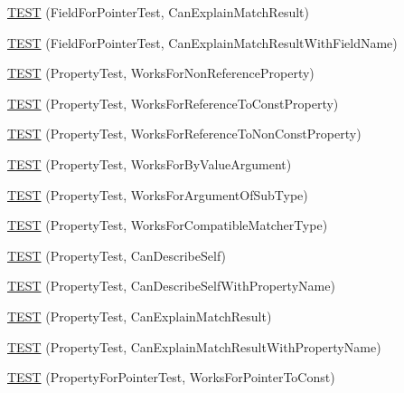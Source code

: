 \begin{DoxyCompactItemize}
\item 
\mbox{\hyperlink{namespacetesting_1_1gmock__matchers__test_a6a4ffd283f91f4e085aa582aedefe38e}{T\+E\+ST}} (Field\+For\+Pointer\+Test, Can\+Explain\+Match\+Result)
\item 
\mbox{\hyperlink{namespacetesting_1_1gmock__matchers__test_a1f0a8f314a858edb7144d2af8e8bdb66}{T\+E\+ST}} (Field\+For\+Pointer\+Test, Can\+Explain\+Match\+Result\+With\+Field\+Name)
\item 
\mbox{\hyperlink{namespacetesting_1_1gmock__matchers__test_a9c42c3b244c7b4d63040e469d5b31e1e}{T\+E\+ST}} (Property\+Test, Works\+For\+Non\+Reference\+Property)
\item 
\mbox{\hyperlink{namespacetesting_1_1gmock__matchers__test_a7254899c6d45df648d5b4ef6eece3ae0}{T\+E\+ST}} (Property\+Test, Works\+For\+Reference\+To\+Const\+Property)
\item 
\mbox{\hyperlink{namespacetesting_1_1gmock__matchers__test_a5b7b02e8fcef1aff9a4afc81d5fb5d5f}{T\+E\+ST}} (Property\+Test, Works\+For\+Reference\+To\+Non\+Const\+Property)
\item 
\mbox{\hyperlink{namespacetesting_1_1gmock__matchers__test_af703b24e2bee13cf7a042f699809a5ab}{T\+E\+ST}} (Property\+Test, Works\+For\+By\+Value\+Argument)
\item 
\mbox{\hyperlink{namespacetesting_1_1gmock__matchers__test_a38a5ad623dda9ef0f48ebaf65485d18e}{T\+E\+ST}} (Property\+Test, Works\+For\+Argument\+Of\+Sub\+Type)
\item 
\mbox{\hyperlink{namespacetesting_1_1gmock__matchers__test_a17b7a59d1dbca0692ebaa71e6f46f1d6}{T\+E\+ST}} (Property\+Test, Works\+For\+Compatible\+Matcher\+Type)
\item 
\mbox{\hyperlink{namespacetesting_1_1gmock__matchers__test_a8c749e210723e33547e58fe8822fb85e}{T\+E\+ST}} (Property\+Test, Can\+Describe\+Self)
\item 
\mbox{\hyperlink{namespacetesting_1_1gmock__matchers__test_abcfb6f5efcd420b9acfeb1e9930a8dc2}{T\+E\+ST}} (Property\+Test, Can\+Describe\+Self\+With\+Property\+Name)
\item 
\mbox{\hyperlink{namespacetesting_1_1gmock__matchers__test_aff810d2cdd79c55d483965a28bb5069a}{T\+E\+ST}} (Property\+Test, Can\+Explain\+Match\+Result)
\item 
\mbox{\hyperlink{namespacetesting_1_1gmock__matchers__test_acd0d13c244310aeed3eb2dacccee644e}{T\+E\+ST}} (Property\+Test, Can\+Explain\+Match\+Result\+With\+Property\+Name)
\item 
\mbox{\hyperlink{namespacetesting_1_1gmock__matchers__test_ac9222439b8e0b1e080650d667044c140}{T\+E\+ST}} (Property\+For\+Pointer\+Test, Works\+For\+Pointer\+To\+Const)

\end{DoxyCompactItemize}

